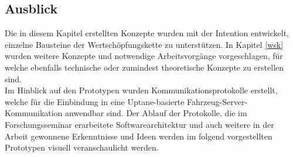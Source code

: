 \subsection{Ausblick}
Die in diesem Kapitel erstellten Konzepte wurden mit der Intention entwickelt, einzelne Bausteine der Wertschöpfungskette zu unterstützen. In Kapitel \ref{wsk} wurden weitere Konzepte und notwendige Arbeitsvorgänge vorgeschlagen, für welche ebenfalls technische oder zumindest theoretische Konzepte zu erstellen sind.\\
Im Hinblick auf den Prototypen wurden Kommunikationsprotokolle erstellt, welche für die Einbindung in eine Uptane-basierte Fahrzeug-Server-Kommunikation anwendbar sind. Der Ablauf der Protokolle, die im Forschungsseminar erarbeitete Softwarearchitektur und auch weitere in der Arbeit gewonnene Erkenntnisse und Ideen werden im folgend vorgestellten Prototypen visuell veranschaulicht werden.\\
\\
\\
\\
\\
\\
\\
\\
\\
\\
\\